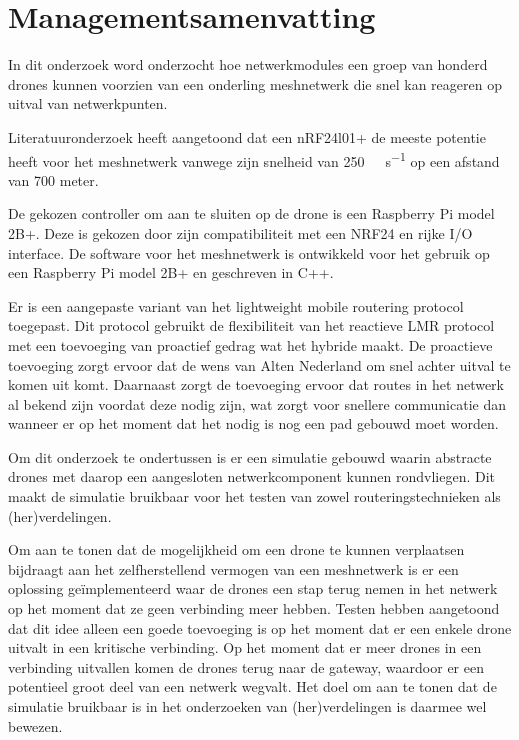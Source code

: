 \documentclass[a4paper, 11pt, oneside]{report}
\begin{document}
\chapter*{Managementsamenvatting}


In dit onderzoek word onderzocht hoe netwerkmodules een groep van honderd drones kunnen voorzien van een onderling meshnetwerk die snel kan reageren op uitval van netwerkpunten.

Literatuuronderzoek heeft aangetoond dat een nRF24l01+ de meeste potentie heeft voor het meshnetwerk vanwege zijn snelheid van \SI{250}{\kilo\bit\per\second} op een afstand van 700 meter.

De gekozen controller om aan te sluiten op de drone is een Raspberry Pi model 2B+. Deze is gekozen door zijn compatibiliteit met een NRF24 en rijke I/O interface. 
De software voor het meshnetwerk is ontwikkeld voor het gebruik op een Raspberry Pi model 2B+ en geschreven in C++.   

Er is een aangepaste variant van het lightweight mobile routering protocol toegepast. Dit protocol gebruikt de flexibiliteit van het reactieve LMR protocol met een toevoeging van proactief gedrag wat het hybride maakt. De proactieve toevoeging zorgt ervoor dat de wens van Alten Nederland om snel achter uitval te komen uit komt. Daarnaast zorgt de toevoeging ervoor dat routes in het netwerk al bekend zijn voordat deze nodig zijn, wat zorgt voor snellere communicatie dan wanneer er op het moment dat het nodig is nog een pad gebouwd moet worden.

Om dit onderzoek te ondertussen is er een simulatie gebouwd waarin abstracte drones met daarop een aangesloten netwerkcomponent kunnen rondvliegen. Dit maakt de simulatie bruikbaar voor het testen van zowel routeringstechnieken als (her)verdelingen. 

Om aan te tonen dat de mogelijkheid om een drone te kunnen verplaatsen bijdraagt aan het zelfherstellend vermogen van een meshnetwerk is er een oplossing geïmplementeerd waar de drones een stap terug nemen in het netwerk op het moment dat ze geen verbinding meer hebben.  Testen hebben aangetoond dat dit idee alleen een goede toevoeging is op het moment dat er een enkele drone uitvalt in een kritische verbinding. Op het moment dat er meer drones in een verbinding uitvallen komen de drones terug naar de gateway, waardoor er een potentieel groot deel van een netwerk wegvalt. Het doel om aan te tonen dat de simulatie bruikbaar is in het onderzoeken van (her)verdelingen is daarmee wel bewezen.
\end{document}
